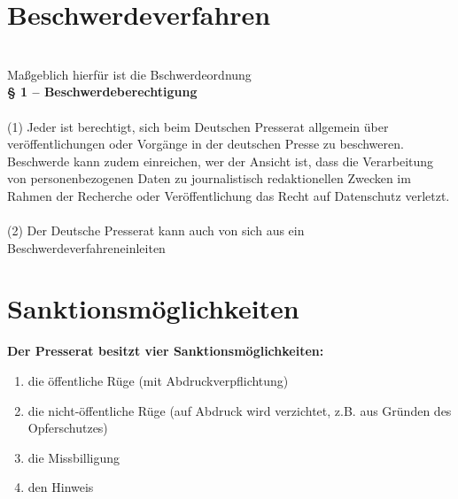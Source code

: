 \section{Beschwerdeverfahren}
\qquad\\
Maßgeblich hierfür ist die Bschwerdeordnung\\

\textbf{§ 1 – Beschwerdeberechtigung}\\
\\
(1) Jeder ist berechtigt, sich beim Deutschen Presserat allgemein über veröffentlichungen oder Vorgänge in der deutschen Presse zu beschweren. Beschwerde kann zudem einreichen, wer der Ansicht ist, dass die Verarbeitung von personenbezogenen Daten zu journalistisch redaktionellen Zwecken im Rahmen der Recherche oder Veröffentlichung das Recht auf Datenschutz verletzt.\\
\\
(2) Der Deutsche Presserat kann auch von sich aus ein Beschwerdeverfahreneinleiten
%
%
%
\section{Sanktionsmöglichkeiten}
\textbf{Der Presserat besitzt vier Sanktionsmöglichkeiten:}
\begin{enumerate}
    \item die öffentliche Rüge (mit Abdruckverpflichtung)
    \item die nicht-öffentliche Rüge (auf Abdruck wird verzichtet, z.B. aus Gründen des Opferschutzes)
    \item die Missbilligung
    \item den Hinweis
\end{enumerate}
